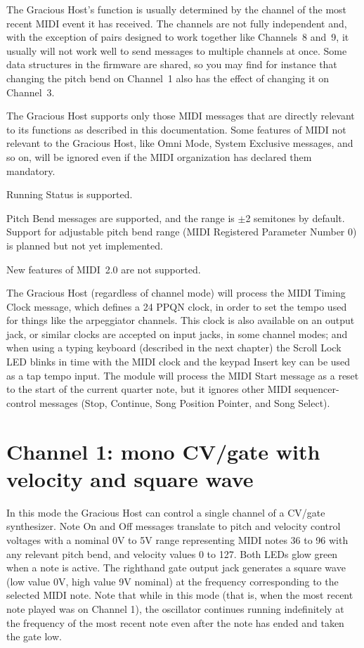 The Gracious Host's function is usually determined by the channel of the
most recent MIDI event it has received.  The channels are not fully
independent and, with the exception of pairs designed to work together like
Channels~8 and~9, it usually will not work well to send messages to multiple
channels at once.  Some data structures in the firmware are shared, so you
may find for instance that changing the pitch bend on Channel~1 also has the
effect of changing it on Channel~3.

The Gracious Host supports only those MIDI messages that are directly
relevant to its functions as described in this documentation.  Some features
of MIDI not relevant to the Gracious Host, like Omni Mode, System Exclusive
messages, and so on, will be ignored even if the MIDI organization has
declared them mandatory.

Running Status is supported.

Pitch Bend messages are supported, and the range is $\pm$2 semitones by
default.  Support for adjustable pitch bend range (MIDI Registered Parameter
Number 0) is planned but not yet implemented.

New features of MIDI~2.0 are not supported.

The Gracious Host (regardless of channel mode) will process the MIDI Timing
Clock message, which defines a 24 PPQN clock, in order to set the tempo used
for things like the arpeggiator channels.  This clock is also available on
an output jack, or similar clocks are accepted on input jacks, in some
channel modes; and when using a typing keyboard (described in the next
chapter) the Scroll Lock LED blinks in time with the MIDI clock and the
keypad Insert key can be used as a tap tempo input.  The module will process
the MIDI Start message as a reset to the start of the current quarter note,
but it ignores other MIDI sequencer-control messages (Stop, Continue, Song
Position Pointer, and Song Select).


\section{Channel 1:  mono CV/gate with velocity and square wave}

In this mode the Gracious Host can control a single channel of a CV/gate
synthesizer.  Note On and Off messages translate to pitch and velocity
control voltages with a nominal 0V to 5V range representing MIDI notes 36 to
96 with any relevant pitch bend, and velocity values 0 to 127.  Both LEDs
glow green when a note is active.  The righthand gate output jack
generates a square wave (low value 0V, high value 9V nominal) at the
frequency corresponding to the selected MIDI note.  Note that while in this
mode (that is, when the most recent note played was on Channel 1), the
oscillator continues running indefinitely at the frequency of the most
recent note even after the note has ended and taken the gate low.

